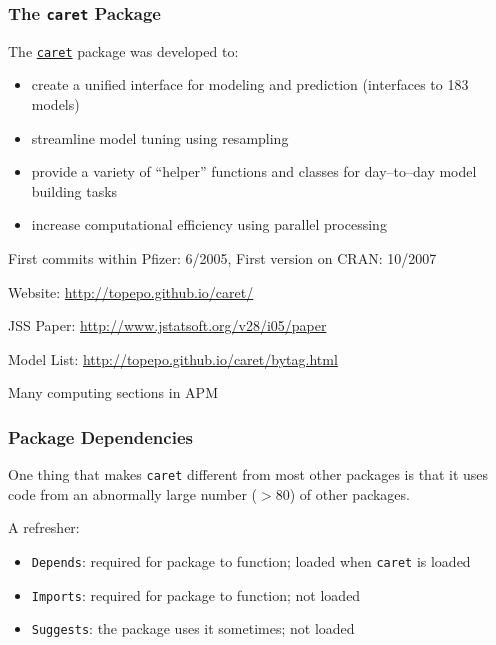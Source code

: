 \documentclass[12 pt]{beamer}\usepackage[]{graphicx}\usepackage[]{color}
\newcommand{\pkg}[1]{{\fontseries{b}\selectfont #1}}
\renewcommand{\pkg}[1]{{\color{darkgreen}\texttt{#1}}}
\begin{document}
  \begin{frame}[fragile]
\frametitle{The \pkg{caret} Package}

The \href{http://cran.r-project.org/web/packages/caret/index.html}{\pkg{caret}}  package was developed to:
  \begin{itemize}
\item create a unified interface for modeling and prediction
(interfaces to 183 models)
\item streamline model tuning using resampling
\item provide a variety of ``helper'' functions and classes for day--to--day model building tasks
\item increase computational efficiency using parallel processing
\end{itemize}

\vspace{.08in}

First commits within Pfizer: 6/2005, First version on CRAN: 10/2007

\vspace{.06in}

Website: \href{http://topepo.github.io/caret/}{http://topepo.github.io/caret/}

\vspace{.06in}

JSS Paper: \href{http://www.jstatsoft.org/v28/i05/paper}{http://www.jstatsoft.org/v28/i05/paper}

\vspace{.06in}

Model List: \href{http://topepo.github.io/caret/bytag.html}{http://topepo.github.io/caret/bytag.html}

\vspace{.06in}

Many computing sections in APM

\end{frame}


  \begin{frame}[fragile]
\frametitle{Package Dependencies}



One thing that makes \pkg{caret} different from most other packages is that it uses code from an abnormally large number ($> 80$) of other packages.

\vspace{.1in}

A refresher:

\begin{itemize}
\item \texttt{Depends}: required for package to function; loaded when \pkg{caret} is loaded
\item \texttt{Imports}: required for package to function; not loaded
\item \texttt{Suggests}: the package uses it sometimes; not loaded
\end{itemize}

\end{frame}
\end{document}
